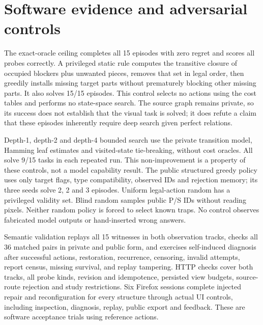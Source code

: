 \documentclass[10pt,twocolumn]{article}
\begin{document}
\section{Software evidence and adversarial controls}
\begin{table}[t]
\centering\small
\caption{Software controls, not VLM or human scores. Runs reuse the same
15 tasks; denominators are task-runs, not independent structures.}

\label{tab:controls}
\end{table}
The exact-oracle ceiling completes all 15 episodes with zero regret and scores
all probes correctly. A privileged static rule computes the transitive closure
of occupied blockers plus unwanted pieces, removes that set in legal order,
then greedily installs missing target parts without prematurely blocking
other missing parts. It also solves 15/15 episodes. This control selects no
actions using the cost tables and performs no state-space search.
The source graph remains private, so its success does not establish that the
visual task is solved; it does refute a claim that these episodes inherently
require deep search given perfect relations.

Depth-1, depth-2 and depth-4 bounded search use the private transition model,
Hamming leaf estimates and visited-state tie-breaking, without cost oracles.
All solve 9/15 tasks in each repeated run. This non-improvement is a
property of these controls, not a model capability result.
The public structured greedy policy uses only target flags, type
compatibility, observed IDs and rejection memory; its three seeds solve
2, 2 and 3 episodes. Uniform legal-action random has a privileged validity
set. Blind random samples public P/S IDs without reading pixels.
Neither random policy is forced to select known traps.
No control observes fabricated model outputs or hand-inserted wrong answers.

Semantic validation replays all 15 witnesses in both observation tracks,
checks all 36 matched pairs in private and public form, and exercises
self-induced diagnosis after successful actions, restoration, recurrence,
censoring, invalid attempts, report census, missing survival, and replay
tampering. HTTP checks cover both tracks, all probe kinds, revision and
idempotence, persisted view budgets, source-route rejection and study
restrictions. Six Firefox sessions complete injected repair and
reconfiguration for every structure through actual UI controls, including
inspection, diagnosis, replay, public export and feedback. These are
software acceptance trials using reference actions.
\end{document}
